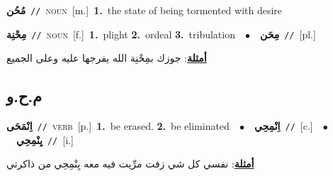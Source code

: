 \documentclass[10pt,a4paper,twoside]{article} %
\begin{document}
\begin{multicols}{2}
{\setlength\topsep{0pt}\textbf{\foreignlanguage{arabic}{مُحُن}}\ {\color{gray}\texttt{//}\color{black}}\ \textsc{noun}\ [m.]\ \textbf{1.}~the state of being tormented with desire\ } \vspace{2mm}

{\setlength\topsep{0pt}\textbf{\foreignlanguage{arabic}{مِحْنِة}}\ {\color{gray}\texttt{//}\color{black}}\ \textsc{noun}\ [f.]\ \textbf{1.}~plight  \textbf{2.}~ordeal  \textbf{3.}~tribulation\ \ $\bullet$\ \ \setlength\topsep{0pt}\textbf{\foreignlanguage{arabic}{مِحَن}}\ {\color{gray}\texttt{//}\color{black}}\ [pl.]\  \begin{flushright}\color{gray}\foreignlanguage{arabic}{\textbf{\underline{\foreignlanguage{arabic}{أمثلة}}}: جوزك بمِحْنِة الله يفرجها عليه وعلى الجميع}\end{flushright}\color{black}} \vspace{2mm}

\vspace{-3mm}
\subsection*{\color{blue}\foreignlanguage{arabic}{م.ح.و}\color{blue}{}} 

{\setlength\topsep{0pt}\textbf{\foreignlanguage{arabic}{اِنْمَحَى}}\ {\color{gray}\texttt{//}\color{black}}\ \textsc{verb}\ [p.]\ \textbf{1.}~be erased.  \textbf{2.}~be eliminated\ \ $\bullet$\ \ \setlength\topsep{0pt}\textbf{\foreignlanguage{arabic}{اِنْمِحِي}}\ {\color{gray}\texttt{//}\color{black}}\ [c.]\ \ $\bullet$\ \ \setlength\topsep{0pt}\textbf{\foreignlanguage{arabic}{يِنْمِحِي}}\ {\color{gray}\texttt{//}\color{black}}\ [i.]\  \begin{flushright}\color{gray}\foreignlanguage{arabic}{\textbf{\underline{\foreignlanguage{arabic}{أمثلة}}}: نفسي كل شي زفت مرِّيت فيه معه يِنْمِحِي من ذاكرتي}\end{flushright}\color{black}} \vspace{2mm}


\end{multicols}
\end{document}
